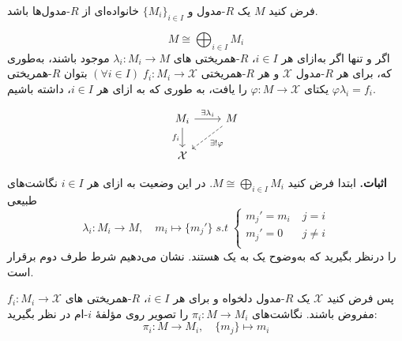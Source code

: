 \begin{frame}
    \begin{theorem}{}
        فرض کنید $M$ یک $R$-مدول و $\{M_i\}_{i \in I}$ خانواده‌ای از $R$-مدول‌ها باشد.


        \[
            M \cong \bigoplus_{i \in I} M_i
        \]
        اگر و تنها اگر
        به‌ازای هر
        \(i\in I\)،
        {\(R\)-همریختی }های
        \(\lambda_i : M_i \to M\)
        موجود باشند، به‌طوری که، برای هر
        {\(R\)-مدول }
        \(\mathcal{X}\)
        و هر
        {\(R\)-همریختی }
        \((\forall i\in I) \; f_i : M_i \to \mathcal{X}\)
        بتوان
        {\(R\)-همریختی }
        یکتای
        \(\varphi: M \to \mathcal{X}\)
        را یافت، به طوری که به ازای هر
        \(i\in I\)،
        داشته باشیم
        \(\varphi\lambda_i=f_i\).

            {
                \large
                \[
                    \begin{tikzcd}[ampersand replacement=\&]
                        M_i \arrow{r}{\exists\lambda_i} \arrow[swap]{d}{f_i} \& M \arrow[dashed]{dl}{\exists! \varphi} \\
                        \mathcal{X} \&
                    \end{tikzcd}
                \]
            }

    \end{theorem}

\end{frame}



\begin{frame}
    \textbf{اثبات. }
    ابتدا فرض کنید
    $M \cong \bigoplus_{i \in I} M_i$.
    در این وضعیت به ازای هر \(i \in I\) نگاشت‌های طبیعی
    \[
        \lambda_i: M_i \to M, \quad m_i \mapsto \{m_j'\} \; s.t \;
        \begin{cases}
            m_j' = m_i & \; j = i    \\
            m_j' = 0   & \; j \neq i \\
        \end{cases}
    \]
    را درنظر بگیرید که به‌وضوح یک به یک هستند.
    نشان می‌دهیم شرط طرف دوم برقرار است.

    پس فرض کنید $\mathcal{X}$ یک $R$-مدول دلخواه و
    برای هر $i \in I$،
    $R$-همریختی های
    $f_i : M_i \to \mathcal{X}$
    مفروض باشند.
    نگاشت‌های
    $\pi_i : M \to M_i$
    را تصویر روی مؤلفهٔ
    \(i\)-ام
    در نظر بگیرید:
    \[
        \pi_i : M \to M_i, \quad \{m_j\} \mapsto m_i
    \]


\end{frame}



